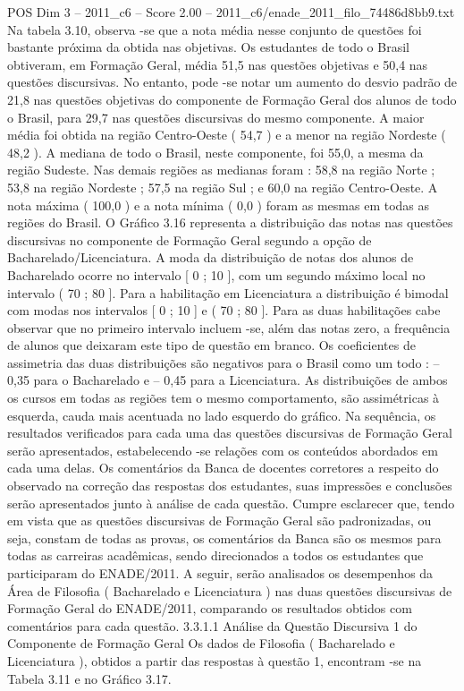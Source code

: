 \begin{textsample}{POS Dim 3 – 2011\_c6 – Score 2.00 – 2011\_c6/enade\_2011\_filo\_74486d8bb9.txt}
Na tabela 3.10, observa -se que a nota média nesse conjunto de questões foi bastante próxima da obtida nas objetivas.
Os estudantes de todo o Brasil obtiveram, em Formação Geral, média 51,5 nas questões objetivas e 50,4 nas questões discursivas.
No entanto, pode -se notar um aumento do desvio padrão de 21,8 nas questões objetivas do componente de Formação Geral dos alunos de todo o Brasil, para 29,7 nas questões discursivas do mesmo componente.
A maior média foi obtida na região Centro-Oeste ( 54,7 ) e a menor na região Nordeste ( 48,2 ).
A mediana de todo o Brasil, neste componente, foi 55,0, a mesma da região Sudeste.
Nas demais regiões as medianas foram : 58,8 na região Norte ; 53,8 na região Nordeste ; 57,5 na região Sul ; e 60,0 na região Centro-Oeste.
A nota máxima ( 100,0 ) e a nota mínima ( 0,0 ) foram as mesmas em todas as regiões do Brasil.
O Gráfico 3.16 representa a distribuição das notas nas questões discursivas no componente de Formação Geral segundo a opção de Bacharelado/Licenciatura.
A moda da distribuição de notas dos alunos de Bacharelado ocorre no intervalo [ 0 ; 10 ], com um segundo máximo local no intervalo ( 70 ; 80 ].
Para a habilitação em Licenciatura a distribuição é bimodal com modas nos intervalos [ 0 ; 10 ] e ( 70 ; 80 ].
Para as duas habilitações cabe observar que no primeiro intervalo incluem -se, além das notas zero, a frequência de alunos que deixaram este tipo de questão em branco.
Os coeficientes de assimetria das duas distribuições são negativos para o Brasil como um todo : – 0,35 para o Bacharelado e – 0,45 para a Licenciatura.
As distribuições de ambos os cursos em todas as regiões tem o mesmo comportamento, são assimétricas à esquerda, cauda mais acentuada no lado esquerdo do gráfico.
Na sequência, os resultados verificados para cada uma das questões discursivas de Formação Geral serão apresentados, estabelecendo -se relações com os conteúdos abordados em cada uma delas.
Os comentários da Banca de docentes corretores a respeito do observado na correção das respostas dos estudantes, suas impressões e conclusões serão apresentados junto à análise de cada questão.
Cumpre esclarecer que, tendo em vista que as questões discursivas de Formação Geral são padronizadas, ou seja, constam de todas as provas, os comentários da Banca são os mesmos para todas as carreiras acadêmicas, sendo direcionados a todos os estudantes que participaram do ENADE/2011.
A seguir, serão analisados os desempenhos da Área de Filosofia ( Bacharelado e Licenciatura ) nas duas questões discursivas de Formação Geral do ENADE/2011, comparando os resultados obtidos com comentários para cada questão. 3.3.1.1 Análise da Questão Discursiva 1 do Componente de Formação Geral Os dados de Filosofia ( Bacharelado e Licenciatura ), obtidos a partir das respostas à questão 1, encontram -se na Tabela 3.11 e no Gráfico 3.17.

\end{textsample}
